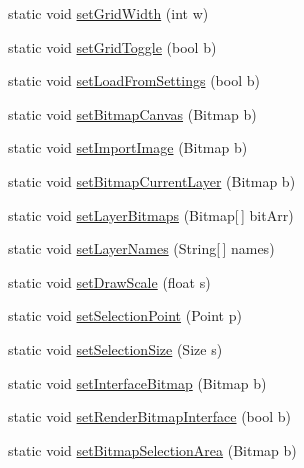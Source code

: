 \begin{DoxyCompactItemize}
\item 
static void \mbox{\hyperlink{class_paint___program_1_1_shared_settings_a512fdde95958e8da348a31f742ccfc60}{set\+Grid\+Width}} (int w)
\item 
static void \mbox{\hyperlink{class_paint___program_1_1_shared_settings_ad45305e433b2452fe5986ecad3adca5a}{set\+Grid\+Toggle}} (bool b)
\item 
static void \mbox{\hyperlink{class_paint___program_1_1_shared_settings_ab8c46472c3e3665c1b1da17290cd69c1}{set\+Load\+From\+Settings}} (bool b)
\item 
static void \mbox{\hyperlink{class_paint___program_1_1_shared_settings_ad3dc8dab533dcfd679008dac8a6cd10b}{set\+Bitmap\+Canvas}} (Bitmap b)
\item 
static void \mbox{\hyperlink{class_paint___program_1_1_shared_settings_abe13ebf4880e018c6643f25950fdf6f3}{set\+Import\+Image}} (Bitmap b)
\item 
static void \mbox{\hyperlink{class_paint___program_1_1_shared_settings_a41d8ffedb8c828de86a207c782cb5bb9}{set\+Bitmap\+Current\+Layer}} (Bitmap b)
\item 
static void \mbox{\hyperlink{class_paint___program_1_1_shared_settings_a5321647ae455924faefab560997d8422}{set\+Layer\+Bitmaps}} (Bitmap\mbox{[}$\,$\mbox{]} bit\+Arr)
\item 
static void \mbox{\hyperlink{class_paint___program_1_1_shared_settings_aa2a037f17b7a15b679b7042c338ebdac}{set\+Layer\+Names}} (String\mbox{[}$\,$\mbox{]} names)
\item 
static void \mbox{\hyperlink{class_paint___program_1_1_shared_settings_ae5afd456b4c251e964d5ce1b2e141cfb}{set\+Draw\+Scale}} (float s)
\item 
static void \mbox{\hyperlink{class_paint___program_1_1_shared_settings_acbd3fb12831e25b712f2a4219046a925}{set\+Selection\+Point}} (Point p)
\item 
static void \mbox{\hyperlink{class_paint___program_1_1_shared_settings_a7b5bc1ce9a80f552517e0f45a8a277d9}{set\+Selection\+Size}} (Size s)
\item 
static void \mbox{\hyperlink{class_paint___program_1_1_shared_settings_a7a64f4bb28c9f1077a7aa4d1393ff0f6}{set\+Interface\+Bitmap}} (Bitmap b)
\item 
static void \mbox{\hyperlink{class_paint___program_1_1_shared_settings_a376364d998b41045a10796315707beca}{set\+Render\+Bitmap\+Interface}} (bool b)
\item 
static void \mbox{\hyperlink{class_paint___program_1_1_shared_settings_a4348e6fa15fb010c2333771e19e93c69}{set\+Bitmap\+Selection\+Area}} (Bitmap b)

\end{DoxyCompactItemize}
